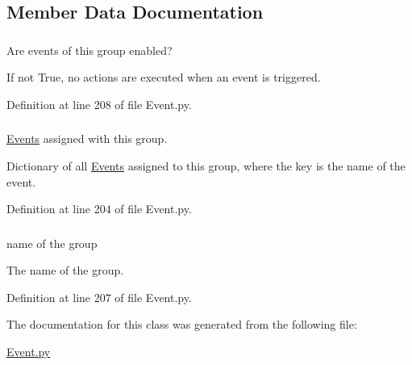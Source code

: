 \subsection{Member Data Documentation}
\hypertarget{class_event_1_1_event_group_af1cda284012e3badea391a0f9573c964}{
\subsubsection[{\_\-\_\-enabled}]{}}
\label{class_event_1_1_event_group_af1cda284012e3badea391a0f9573c964}


Are events of this group enabled? 

If not True, no actions are executed when an event is triggered. 

Definition at line 208 of file Event.py.

\hypertarget{class_event_1_1_event_group_ac27ccf54470339b7343b424c86da8ab9}{
\subsubsection[{\_\-\_\-events}]{}}
\label{class_event_1_1_event_group_ac27ccf54470339b7343b424c86da8ab9}


\hyperlink{namespace_event}{Events} assigned with this group. 

Dictionary of all \hyperlink{namespace_event}{Events} assigned to this group, where the key is the name of the event. 

Definition at line 204 of file Event.py.

\hypertarget{class_event_1_1_event_group_a5d5ff8c585cc7abeb5e50d1c81d40813}{
\subsubsection[{name}]{}}
\label{class_event_1_1_event_group_a5d5ff8c585cc7abeb5e50d1c81d40813}


name of the group 

The name of the group. 

Definition at line 207 of file Event.py.



The documentation for this class was generated from the following file:\begin{DoxyCompactItemize}
\item 
\hyperlink{_event_8py}{Event.py}\end{DoxyCompactItemize}
